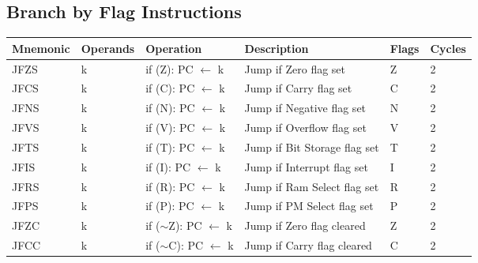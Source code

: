 \begin{footnotesize}
\subsection{Branch by Flag Instructions}
\begin{tabular}{|p{14.5mm}|p{14mm}|p{47mm}|p{46.5mm}|p{14mm}|p{10mm}|}
    \rowcolor{gray!50}
    Mnemonic & Operands  & Operation                                                              & Description & Flags & Cycles \\ \hline
    JFZS     & k         & if (Z): PC $\leftarrow$ k                                              & Jump if Zero flag set                     & Z              & 2      \\
    JFCS     & k         & if (C): PC $\leftarrow$ k                                              & Jump if Carry flag set                    & C              & 2      \\
    JFNS     & k         & if (N): PC $\leftarrow$ k                                              & Jump if Negative flag set                 & N              & 2      \\
    JFVS     & k         & if (V): PC $\leftarrow$ k                                              & Jump if Overflow flag set                 & V              & 2      \\
    JFTS     & k         & if (T): PC $\leftarrow$ k                                              & Jump if Bit Storage flag set              & T              & 2      \\
    JFIS     & k         & if (I): PC $\leftarrow$ k                                              & Jump if Interrupt flag set                & I              & 2      \\
    JFRS     & k         & if (R): PC $\leftarrow$ k                                              & Jump if Ram Select flag set               & R              & 2      \\
    JFPS     & k         & if (P): PC $\leftarrow$ k                                              & Jump if PM Select flag set                & P              & 2      \\
    JFZC     & k         & if ($\sim$Z): PC $\leftarrow$ k                                        & Jump if Zero flag cleared                 & Z              & 2      \\
    JFCC     & k         & if ($\sim$C): PC $\leftarrow$ k                                        & Jump if Carry flag cleared                & C              & 2      \\

\end{tabular}
\end{footnotesize}
